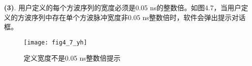 \vspace{0.4cm}
\noindent \textbf{(3)}. 用户定义的每个方波序列的宽度必须是0.05 ns的整数倍。如图4.7，当用户定义的方波序列中存在单个方波脉冲宽度非0.05 ns整数倍时，软件会弹出提示对话框。

\vspace{0.2cm}
\begin{figure}[H]
\centering
\texttt{[image: fig4\_7\_yh]}
\caption{定义宽度不是0.05 ns整数倍提示}
\end{figure}

%





